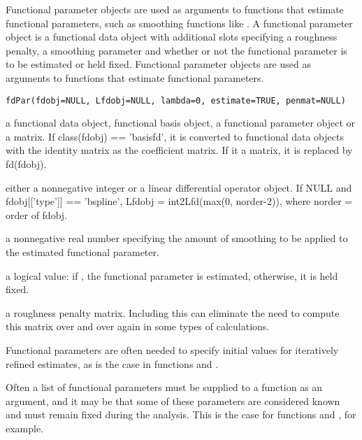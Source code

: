 \begin{Description}\relax
Functional parameter objects are used as arguments to functions that
estimate functional parameters, such as smoothing functions like
.  A functional parameter object is a functional
data object with additional slots specifying a roughness penalty, a
smoothing parameter and whether or not the functional parameter is to
be estimated or held fixed.  Functional parameter objects are used as
arguments to functions that estimate functional parameters.
\end{Description}
\begin{Usage}
\begin{verbatim}
fdPar(fdobj=NULL, Lfdobj=NULL, lambda=0, estimate=TRUE, penmat=NULL)
\end{verbatim}
\end{Usage}
\begin{Arguments}
\begin{ldescription}
\item[\code{fdobj}] a functional data object, functional basis object, a functional
parameter object or a matrix.  If class(fdobj) == 'basisfd', it is
converted to functional data objects with the identity matrix as the
coefficient matrix.  If it a matrix, it is replaced by fd(fdobj).      

\item[\code{Lfdobj}] either a nonnegative integer or a linear differential operator
object.  If NULL and fdobj[['type']] == 'bspline', Lfdobj =
int2Lfd(max(0, norder-2)), where norder = order of fdobj.   

\item[\code{lambda}] a nonnegative real number specifying the amount of smoothing
to be applied to the estimated functional parameter.

\item[\code{estimate}] a logical value:  if , the functional parameter is
estimated, otherwise, it is held fixed.

\item[\code{penmat}] a roughness penalty matrix.  Including this can eliminate the need
to compute this matrix over and over again in some types of
calculations.

\end{ldescription}
\end{Arguments}
\begin{Details}\relax
Functional parameters are often needed to specify initial
values for iteratively refined estimates, as is the case in
functions  and .

Often a list of functional parameters must be supplied to a function
as an argument, and it may be that some of these parameters are
considered known and must remain fixed during the analysis.  This is
the case for functions  and  , for
example.
\end{Details}
